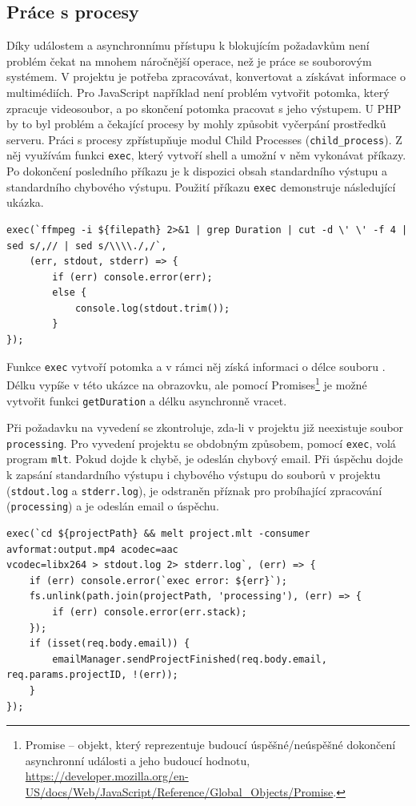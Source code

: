 \subsection{Práce s procesy}\label{ch:Práce s procesy}
Díky událostem a asynchronnímu přístupu k blokujícím požadavkům není problém čekat na mnohem náročnější operace, než je práce se souborovým systémem. V projektu je potřeba zpracovávat, konvertovat a získávat informace o multimédiích. Pro JavaScript například není problém vytvořit potomka, který zpracuje videosoubor, a po skončení potomka pracovat s jeho výstupem. U PHP by to byl problém a čekající procesy by mohly způsobit vyčerpání prostředků serveru. Práci s procesy zpřístupňuje modul Child Processes (\texttt{child\_process}). Z něj využívám funkci \texttt{exec}, který vytvoří shell a umožní v něm vykonávat příkazy. Po dokončení posledního příkazu je k dispozici obsah standardního výstupu a standardního chybového výstupu. Použití příkazu \texttt{exec} demonstruje následující ukázka.
\begin{lstlisting}[style=JavaScript]
exec(`ffmpeg -i ${filepath} 2>&1 | grep Duration | cut -d \' \' -f 4 | sed s/,// | sed s/\\\\./,/`,
    (err, stdout, stderr) => {
        if (err) console.error(err);
        else {
            console.log(stdout.trim());
        }
});
\end{lstlisting}
Funkce \texttt{exec} vytvoří potomka a v rámci něj získá informaci o délce souboru . Délku vypíše v této ukázce na obrazovku, ale pomocí Promises\footnote{Promise -- objekt, který reprezentuje budoucí úspěšné/neúspěšné dokončení asynchronní události a jeho budoucí hodnotu, \url{https://developer.mozilla.org/en-US/docs/Web/JavaScript/Reference/Global_Objects/Promise}.} je možné vytvořit funkci \texttt{getDuration} a délku asynchronně vracet.

Při požadavku na vyvedení se zkontroluje, zda-li v projektu již neexistuje soubor \texttt{processing}. Pro vyvedení projektu se obdobným způsobem, pomocí \texttt{exec}, volá program \texttt{mlt}. Pokud dojde k chybě, je odeslán chybový email. Při úspěchu dojde k zapsání standardního výstupu i chybového výstupu do souborů v projektu (\texttt{stdout.log} a \texttt{stderr.log}), je odstraněn příznak pro probíhající zpracování (\texttt{processing}) a je odeslán email o úspěchu.
\begin{lstlisting}[style=JavaScript]
exec(`cd ${projectPath} && melt project.mlt -consumer avformat:output.mp4 acodec=aac
vcodec=libx264 > stdout.log 2> stderr.log`, (err) => {
    if (err) console.error(`exec error: ${err}`);
    fs.unlink(path.join(projectPath, 'processing'), (err) => {
        if (err) console.error(err.stack);
    });
    if (isset(req.body.email)) {
        emailManager.sendProjectFinished(req.body.email, req.params.projectID, !(err));
    }
});
\end{lstlisting}\textbf{}

